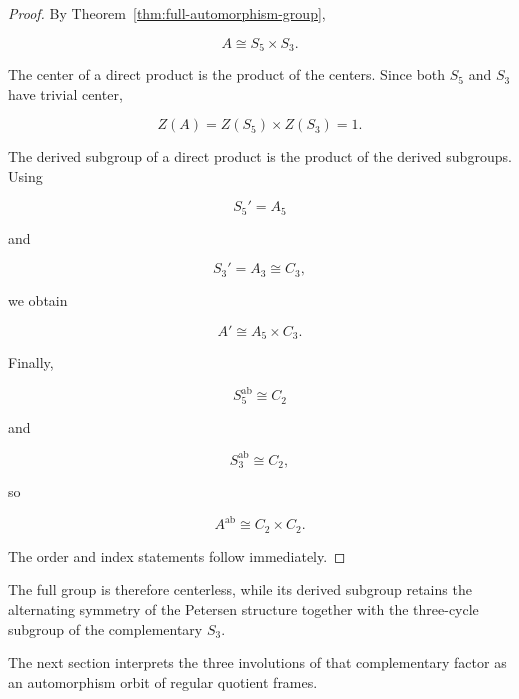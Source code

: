 \begin{proof}

By Theorem~\ref{thm:full-automorphism-group},

\[
A
\cong
S_{5}\times S_{3}.
\]

The center of a direct product is the product of the centers. Since both
\(S_{5}\) and \(S_{3}\) have trivial center,

\[
Z(A)
=
Z(S_{5})\times Z(S_{3})
=
1.
\]

The derived subgroup of a direct product is the product of the derived
subgroups. Using

\[
S_{5}'=A_{5}
\]

and

\[
S_{3}'=A_{3}\cong C_{3},
\]

we obtain

\[
A'
\cong
A_{5}\times C_{3}.
\]

Finally,

\[
S_{5}^{\mathrm{ab}}\cong C_{2}
\]

and

\[
S_{3}^{\mathrm{ab}}\cong C_{2},
\]

so

\[
A^{\mathrm{ab}}
\cong
C_{2}\times C_{2}.
\]

The order and index statements follow immediately.
\end{proof}

The full group is therefore centerless, while its derived subgroup retains
the alternating symmetry of the Petersen structure together with the
three-cycle subgroup of the complementary \(S_{3}\).

The next section interprets the three involutions of that complementary
factor as an automorphism orbit of regular quotient frames.
